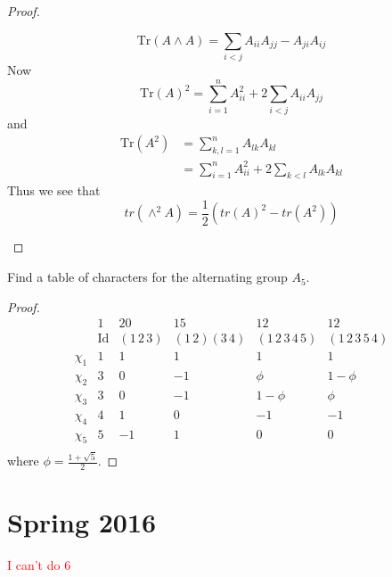 \documentclass[openany]{book}
\begin{document}
\begin{proof}
\begin{itemize}
        \begin{equation*}
            \text{Tr}(A\wedge A)=\sum_{i<j}A_{ii}A_{jj}-A_{ji}A_{ij}
        \end{equation*}
        Now 
        \begin{equation*}
            \text{Tr}(A)^2=\sum_{i=1}^nA_{ii}^2+2\sum_{i<j}A_{ii}A_{jj}
        \end{equation*}
        and 
        \begin{align*}
            \text{Tr}(A^2)&=\sum_{k,l=1}^nA_{lk}A_{kl}\\
            &=\sum_{i=1}^nA_{ii}^2+2\sum_{k<l}A_{lk}A_{kl}
        \end{align*}
        Thus we see that 
        \[tr(\wedge^{2}A)=\frac{1}{2}(tr(A)^{2}-tr(A^{2}))\]
    \end{itemize}

\end{proof}

\begin{prob}
    Find a table of characters for the alternating group \(A_{5}\).
\end{prob}
\begin{proof}
    \[
\begin{array}{c|ccccc}
 & \text{1} & \text{20} & \text{15} & \text{12} & \text{12} \\ 
 & \text{Id} & (1\,2\,3) & (1\,2)(3\,4) & (1\,2\,3\,4\,5) & (1\,2\,3\,5\,4) \\ 
\hline
\chi_1 & 1 & 1 & 1 & 1 & 1 \\ 
\chi_2 & 3 & 0 & -1 & \phi & 1-\phi \\ 
\chi_3 & 3 & 0 & -1 & 1-\phi & \phi \\ 
\chi_4 & 4 & 1 & 0 & -1 & -1 \\ 
\chi_5 & 5 & -1 & 1 & 0 & 0 \\ 
\end{array}
\]
where $\phi=\frac{1+\sqrt{5}}{2}$.
\end{proof}


\chapter{Spring 2016}

\textcolor{red}{I can't do 6}
\end{document}
